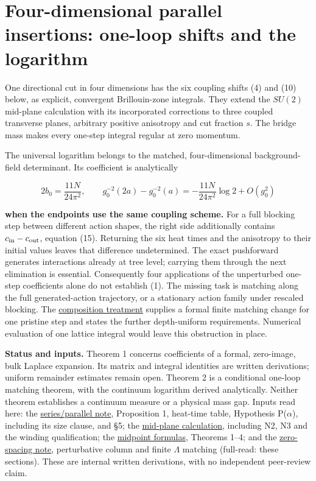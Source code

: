 \documentclass[11pt,a4paper]{article}
\begin{document}
\hypertarget{four-dimensional-parallel-insertions-one-loop-shifts-and-the-logarithm}{%
\section{Four-dimensional parallel insertions: one-loop shifts and the
logarithm}\label{four-dimensional-parallel-insertions-one-loop-shifts-and-the-logarithm}}

One directional cut in four dimensions has the six coupling shifts (4)
and (10) below, as explicit, convergent Brillouin-zone integrals. They
extend the \(SU(2)\) mid-plane calculation with its incorporated
corrections to three coupled transverse planes, arbitrary positive
anisotropy and cut fraction \(s\). The bridge mass makes every one-step
integral regular at zero momentum.

The universal logarithm belongs to the matched, four-dimensional
background-field determinant. Its coefficient is analytically

\[2b_0=\frac{11N}{24\pi^2},\qquad
 g_0^{-2}(2a)-g_0^{-2}(a)=-\frac{11N}{24\pi^2}\log2+O(g_0^2)
\tag{1}\]

\textbf{when the endpoints use the same coupling scheme.} For a full
blocking step between different action shapes, the right side
additionally contains \(c_{\rm in}-c_{\rm out}\), equation (15).
Returning the six heat times and the anisotropy to their initial values
leaves that difference undetermined. The exact pushforward generates
interactions already at tree level; carrying them through the next
elimination is essential. Consequently four applications of the
unperturbed one-step coefficients alone do not establish (1). The
missing task is matching along the full generated-action trajectory, or
a stationary action family under rescaled blocking. The
\href{four-dimensional-composition.md}{composition treatment} supplies a
formal finite matching change for one pristine step and states the
further depth-uniform requirements. Numerical evaluation of one lattice
integral would leave this obstruction in place.

\textbf{Status and inputs.} Theorem 1 concerns coefficients of a formal,
zero-image, bulk Laplace expansion. Its matrix and integral identities
are written derivations; uniform remainder estimates remain open.
Theorem 2 is a conditional one-loop matching theorem, with the continuum
logarithm derived analytically. Neither theorem establishes a continuum
measure or a physical mass gap. Inputs read here: the
\href{series-parallel-gauge-refinement.md}{series/parallel note},
Proposition 1, heat-time table, Hypothesis P(\(\alpha\)), including its
size clause, and §5; the \href{su2-midplane-order-t.md}{mid-plane
calculation}, including N2, N3 and the winding qualification; the
\href{su2-midpoint-exact.md}{midpoint formulas}, Theorems 1--4; and the
\href{zero-spacing-any-action.md}{zero-spacing note}, perturbative
column and finite \(\Lambda\) matching (full-read: these sections).
These are internal written derivations, with no independent peer-review
claim.
\end{document}
